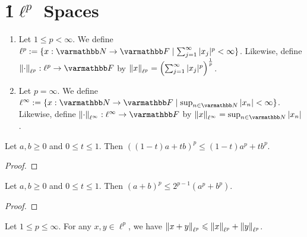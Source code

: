 \section{\h1$\ell^p$ Spaces}
\begin{definition}
    \phantom{a}
        \begin{enumerate}[label = (\arabic*),itemsep=1pt,topsep=3pt]
            \item Let $1 \leq p < \infty$. We define $\ell^p := \{x : \bfN \rightarrow \bfF \mid \sum_{j = 1}^\infty |x_j|^p < \infty\}$. Likewise, define $\lnorm \cdot \rnorm_{\ell^p}:\ell^p \rightarrow \bfF$ by $\left\lVert x \right\rVert_{\ell^p} = \left( \sum_{j = 1}^\infty |x_j|^p \right)^\frac{1}{p}$.
            
            \item Let $p = \infty$. We define $\ell^\infty := \{x:\bfN \rightarrow \bfF \mid \sup_{n \in \bfN}|x_n| < \infty\}$. Likewise, define $\lnorm \cdot \rnorm_{\ell^\infty}:\ell^\infty \rightarrow \bfF$ by $\lnorm x \rnorm_{\ell^\infty} = \sup_{n \in \bfN}|x_n|$.
        \end{enumerate}
\end{definition}

\begin{lemma}\label{lemma:secant}
    Let $a,b \geq 0$ and $0 \leq t \leq 1$. Then $((1-t)a + tb)^p \leq (1-t)a^p + tb^p$.
\end{lemma}
    {\color{red} \begin{proof}
        
    \end{proof}}

\begin{lemma}\label{lemma:p-thing}
    Let $a,b \geq 0$ and $0 \leq t \leq 1$. Then $(a+b)^p \leq 2^{p-1}(a^p +b^p)$.
\end{lemma}
    {\color{red} \begin{proof}
        
    \end{proof}}

\begin{lemma}\label{lemma:minkowski}
    Let $1 \leq p \leq \infty$. For any $x,y \in \ell^p$, we have $\left\lVert x + y \right\rVert_{\ell^p} \leqslant \left\lVert x \right\rVert_{\ell^p} + \left\lVert y \right\rVert_{\ell^p}$.
\end{lemma}

